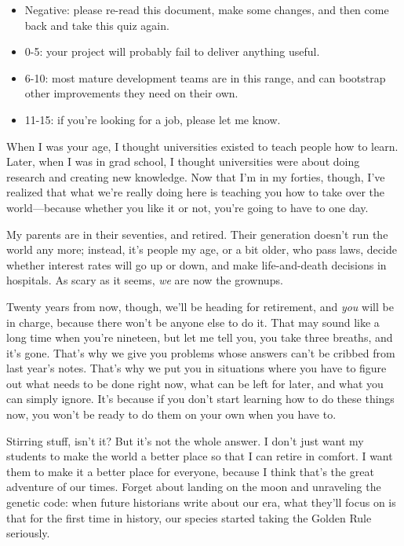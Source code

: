 \documentclass{report}
\begin{document}
\begin{itemize}

  \item Negative: please re-read this document, make some changes, and
  then come back and take this quiz again.

  \item 0-5: your project will probably fail to deliver anything
  useful.

  \item 6-10: most mature development teams are in this range, and can
  bootstrap other improvements they need on their own.

  \item 11-15: if you're looking for a job, please let me know.

\end{itemize}


When I was your age, I thought universities existed to teach people
how to learn.  Later, when I was in grad school, I thought
universities were about doing research and creating new knowledge. Now
that I'm in my forties, though, I've realized that what we're really
doing here is teaching you how to take over the world---because
whether you like it or not, you're going to have to one day.

My parents are in their seventies, and retired.  Their generation
doesn't run the world any more; instead, it's people my age, or a bit
older, who pass laws, decide whether interest rates will go up or
down, and make life-and-death decisions in hospitals.  As scary as it
seems, \emph{we} are now the grownups.

Twenty years from now, though, we'll be heading for retirement, and
\emph{you} will be in charge, because there won't be anyone else to do
it.  That may sound like a long time when you're nineteen, but let me
tell you, you take three breaths, and it's gone.  That's why we give
you problems whose answers can't be cribbed from last year's notes.
That's why we put you in situations where you have to figure out what
needs to be done right now, what can be left for later, and what you
can simply ignore.  It's because if you don't start learning how to do
these things now, you won't be ready to do them on your own when you
have to.

Stirring stuff, isn't it? But it's not the whole answer.  I don't just
want my students to make the world a better place so that I can retire
in comfort.  I want them to make it a better place for everyone,
because I think that's the great adventure of our times. Forget about
landing on the moon and unraveling the genetic code: when future
historians write about our era, what they'll focus on is that for the
first time in history, our species started taking the Golden Rule
seriously.
\end{document}
